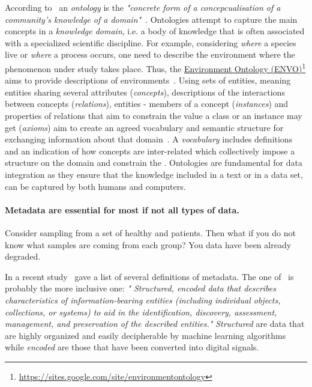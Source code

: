       According to~\citeauthor{stevens2000ontology} an \textit{ontology} is the \textit{"concrete form of a concepcualisation
      of a community's knowledge of a domain"}~\cite{stevens2000ontology}.
      Ontologies attempt to capture the main concepts in a \textit{knowledge domain}, 
      i.e. a body of knowledge that is often associated with a
      specialized scientific discipline. 
      For example, considering \textit{where} a species live or \textit{where} a process occurs, one need to describe the environment where the phenomenon under study 
      takes place. 
      Thus, the \href{https://sites.google.com/site/environmentontology}{Environment Ontology (ENVO)}\footnote{\href{https://sites.google.com/site/environmentontology}{https://sites.google.com/site/environmentontology}} aims to provide descriptions of environments~\cite{buttigieg2016environment}.
      Using sets of entities, meaning entities sharing several attributes (\textit{concepts}), 
      descriptions of the interactions between concepts (\textit{relations}), 
      entities - members of a concept (\textit{instances}) and 
      properties of relations that aim to constrain the value a class or an instance may get (\textit{axioms}) aim to create an agreed vocabulary and
      semantic structure for exchanging
      information about that domain~\cite{stevens2000ontology}. 
      A \textit{vocabulary} includes definitions and an indication of how concepts are inter-related which collectively impose a structure on the domain and constrain the
      \cite{uschold1998enterprise}.
      Ontologies are fundamental for data integration as they ensure that the knowledge
      included in a text or in a data set, can be captured by both humans and computers. 


      \paragraph{Metadata are essential for most if not all types of data.} 
      Consider sampling from a set of healthy and patients. 
      Then what if you do not know what samples are coming from each group? 
      You data have been already degraded. 

      In a recent study~\citeauthor{furner2020definitions} gave a list of several definitions of metadata.
      The one of~\citeauthor{zeng_qin_2016} is probably the more inclusive one:
      \textit{"
      Structured, encoded data that describes characteristics of information-bearing entities
      (including individual objects, collections, or systems) to aid in the identification,
      discovery, assessment, management, and preservation of the described entities."
      }
      \textit{Structured} are data that are highly organized and easily decipherable by machine learning algorithms while
      \textit{encoded} are those that have been converted into digital signals.

